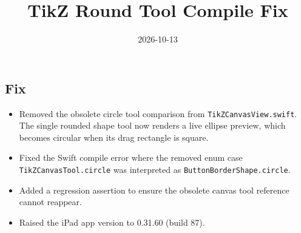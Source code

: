 \documentclass[a4paper]{article}
\title{TikZ Round Tool Compile Fix}
\date{2026-10-13}
\begin{document}
   \maketitle

   \begin{preview}
      \section*{Fix}
      \begin{itemize}
         \item Removed the obsolete circle tool comparison from
               \texttt{TikZCanvasView.swift}. The single rounded shape tool
               now renders a live ellipse preview, which becomes circular
               when its drag rectangle is square.
         \item Fixed the Swift compile error where the removed enum case
               \texttt{TikZCanvasTool.circle} was interpreted as
               \texttt{ButtonBorderShape.circle}.
         \item Added a regression assertion to ensure the obsolete
               canvas tool reference cannot reappear.
         \item Raised the iPad app version to 0.31.60 (build 87).
      \end{itemize}
   \end{preview}
\end{document}
